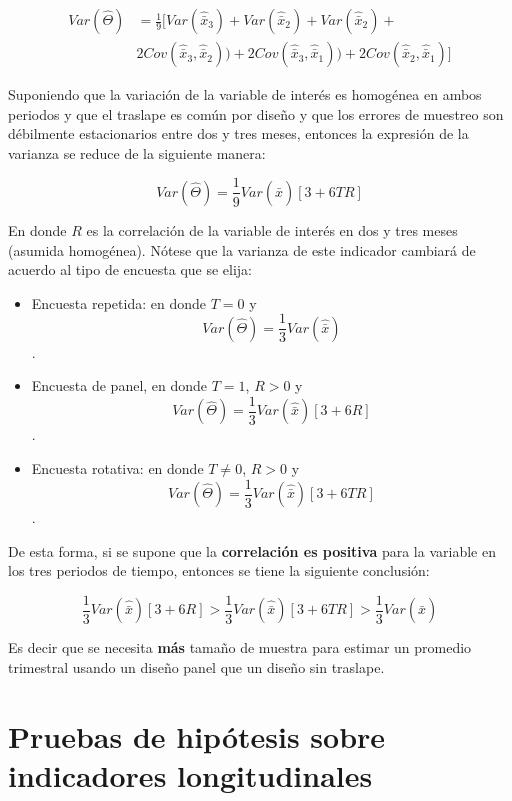 \documentclass[12pt,spanish,]{book}
\providecommand{\tightlist}{%
  \setlength{\itemsep}{0pt}\setlength{\parskip}{0pt}}
\begin{document}
\[
\begin{split}
Var(\hat{\Theta}) & = \frac{1}{9}[Var(\hat{\bar{x}}_3) + Var(\hat{\bar{x}}_2) + Var(\hat{\bar{x}}_2) + \\ 
&2Cov(\hat{\bar{x}}_3, \hat{\bar{x}}_2)) + 2Cov(\hat{\bar{x}}_3, \hat{\bar{x}}_1)) + 2Cov(\hat{\bar{x}}_2, \hat{\bar{x}}_1)]
\end{split}
\]

Suponiendo que la variación de la variable de interés es homogénea en ambos periodos y que el traslape es común por diseño y que los errores de muestreo son débilmente estacionarios entre dos y tres meses, entonces la expresión de la varianza se reduce de la siguiente manera:

\[
Var(\hat{\Theta}) = \frac{1}{9} Var(\hat{\bar{x}})[3 + 6TR]
\]

En donde \(R\) es la correlación de la variable de interés en dos y tres meses (asumida homogénea). Nótese que la varianza de este indicador cambiará de acuerdo al tipo de encuesta que se elija:

\begin{itemize}
\tightlist
\item
  Encuesta repetida: en donde \(T=0\) y
  \[Var(\hat{\Theta}) = \frac{1}{3} Var(\hat{\bar{x}})\].
\item
  Encuesta de panel, en donde \(T=1\), \(R > 0\) y
  \[Var(\hat{\Theta}) = \frac{1}{3} Var(\hat{\bar{x}}) [3+6R]\].
\item
  Encuesta rotativa: en donde \(T\neq 0\), \(R > 0\) y
  \[Var(\hat{\Theta}) = \frac{1}{3} Var(\hat{\bar{x}}) [3+6TR]\].
\end{itemize}

De esta forma, si se supone que la \textbf{correlación es positiva} para la variable en los tres periodos de tiempo, entonces se tiene la siguiente conclusión:

\[
\frac{1}{3} Var(\hat{\bar{x}}) [3+6R] > \frac{1}{3} Var(\hat{\bar{x}}) [3+6TR] > \frac{1}{3} Var(\hat{\bar{x}})
\]

Es decir que se necesita \textbf{más} tamaño de muestra para estimar un promedio trimestral usando un diseño panel que un diseño sin traslape.

\hypertarget{pruebas-de-hipotesis-sobre-indicadores-longitudinales}{%
\section{Pruebas de hipótesis sobre indicadores longitudinales}\label{pruebas-de-hipotesis-sobre-indicadores-longitudinales}}
\end{document}
